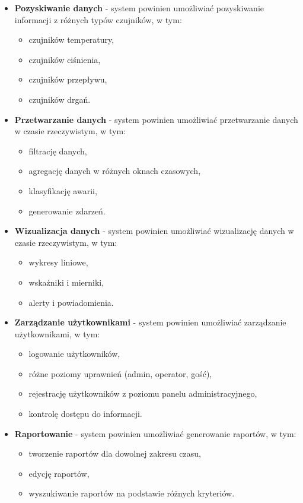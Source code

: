 \begin{itemize}
    \item \textbf{Pozyskiwanie danych} - system powinien umożliwiać pozyskiwanie informacji z różnych typów czujników, w tym:
   \begin{itemize}
       \item czujników temperatury,
       \item czujników ciśnienia,
       \item czujników przepływu,
       \item czujników drgań.
   \end{itemize}
    
    \item \textbf{Przetwarzanie danych} - system powinien umożliwiać przetwarzanie danych w czasie rzeczywistym, w tym:
    \begin{itemize}
        \item filtrację danych,
        \item agregację danych w różnych oknach czasowych,
        \item klasyfikację awarii,
        \item generowanie zdarzeń.
    \end{itemize}
    
    \item \textbf{Wizualizacja danych} - system powinien umożliwiać wizualizację danych w czasie rzeczywistym, w tym:
    \begin{itemize}
        \item wykresy liniowe,
        \item wskaźniki i mierniki,
        \item alerty i powiadomienia.
    \end{itemize}
    
   \item \textbf{Zarządzanie użytkownikami} - system powinien umożliwiać zarządzanie użytkownikami, w tym:
   \begin{itemize}
       \item logowanie użytkowników,
       \item różne poziomy uprawnień (admin, operator, gość),
       \item rejestrację użytkowników z poziomu panelu administracyjnego,
       \item kontrolę dostępu do informacji. \newline
   \end{itemize}
    

    \item \textbf{Raportowanie} - system powinien umożliwiać generowanie raportów, w tym:
   \begin{itemize}
       \item tworzenie raportów dla dowolnej zakresu czasu,
       \item edycję raportów,
       \item wyszukiwanie raportów na podstawie różnych kryteriów.
   \end{itemize}
\end{itemize}

